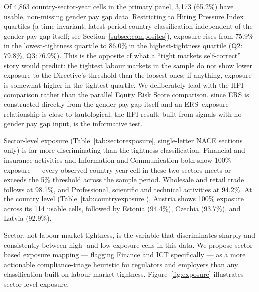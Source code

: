 \documentclass[12pt,a4paper]{article}
\begin{document}
Of 4,863 country-sector-year cells in the primary panel, 3,173 (65.2\%) have
usable, non-missing gender pay gap data.  Restricting to Hiring Pressure Index
quartiles (a time-invariant, latest-period country classification independent of
the gender pay gap itself; see Section~\ref{subsec:composites}), exposure rises
from 75.9\% in the lowest-tightness quartile to 86.0\% in the highest-tightness
quartile (Q2:\,79.8\%, Q3:\,76.9\%).  This is the opposite of what a ``tight
markets self-correct'' story would predict: the tightest labour markets in the
sample do not show lower exposure to the Directive's threshold than the loosest
ones; if anything, exposure is somewhat higher in the tightest quartile.  We
deliberately lead with the HPI comparison rather than the parallel Equity Risk
Score comparison, since ERS is constructed directly from the gender pay gap
itself and an ERS--exposure relationship is close to tautological; the HPI
result, built from signals with no gender pay gap input, is the informative test.

Sector-level exposure (Table~\ref{tab:sectorexposure}, single-letter NACE
sections only) is far more discriminating than the tightness classification.
Financial and insurance activities and Information and Communication both show
100\% exposure --- every observed country-year cell in these two sectors meets or
exceeds the 5\% threshold across the sample period.  Wholesale and retail trade
follows at 98.1\%, and Professional, scientific and technical activities at
94.2\%.  At the country level (Table~\ref{tab:countryexposure}), Austria shows
100\% exposure across its 114 usable cells, followed by Estonia (94.4\%),
Czechia (93.7\%), and Latvia (92.9\%).

Sector, not labour-market tightness, is the variable that discriminates sharply
and consistently between high- and low-exposure cells in this data.  We propose
sector-based exposure mapping --- flagging Finance and ICT specifically --- as a
more actionable compliance-triage heuristic for regulators and employers than any
classification built on labour-market tightness.  Figure~\ref{fig:exposure}
illustrates sector-level exposure.
\end{document}
